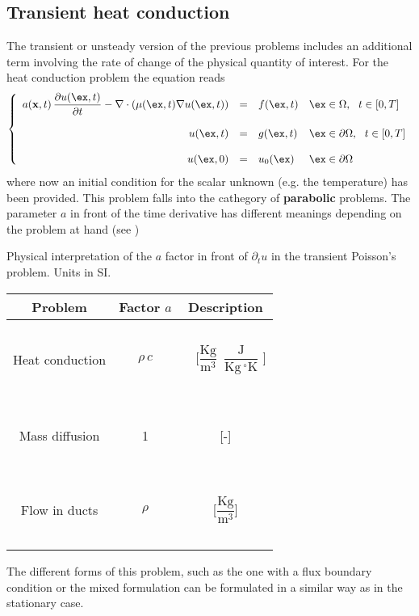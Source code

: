 \subsection{Transient heat conduction} 

The transient or unsteady version of the previous problems includes an additional term
involving the rate of change of the physical quantity of interest.
For the heat conduction problem the equation reads
\begin{equation}
\left \{
\begin{array}{rcll}
a(\mathbf{x},t)\,\dfrac{\partial{u}(\ex,t)}{\partial{t}} -\nabla \cdot \left ( \mu(\ex,t) \nabla{u}(\ex,t) \right) & = & f(\ex,t) & \ex \in \Omega,~~t \in [0,T] \\
& & & \\
u(\ex,t) & = & g(\ex,t) & \ex \in \partial{\Omega},~~t \in [0,T] \\
& & & \\
u(\ex,0) & = & u_0(\ex) & \ex \in \partial{\Omega}
\end{array}
\right.
\end{equation}
where now an initial condition for the scalar unknown (e.g. the temperature)
has been provided. This problem falls into the cathegory of \textbf{parabolic}
problems. The parameter $a$ in front of the time derivative
has different meanings depending on the problem at hand (see )
\begin{margintable}
\caption[]{Physical interpretation of the $a$ factor in front of $\partial_t{u}$ in the transient Poisson's problem. Units in SI.}
\begin{tabular}{ c c c }
	\toprule
	Problem & Factor $a$ & Description \\
	\midrule
	\multirow{3}{4em}{Heat conduction} & ~ & ~ \\
                                         ~ & $\rho \, c$ & ~ {\footnotesize [$\dfrac{\mbox{Kg}}{\mbox{m}^3}$~$\dfrac{\mbox{J}}{\mbox{Kg}\,^{\circ}\mbox{K}}$ ]}  \\ 
                                         ~ & ~ & ~  \\
	\multirow{3}{4em}{Mass diffusion} & ~ & ~ \\
                                        ~ & 1 &  {\footnotesize [-]}\\ 
                                        ~ & ~ & ~\\
        \multirow{3}{4em}{Flow in ducts}  & ~ & ~\\
                                        ~ & $\rho$ & {\footnotesize [$\dfrac{\mbox{Kg}}{\mbox{m}^3}$]}\\ 
                                        ~ & ~ & ~\\
	\bottomrule
\end{tabular}
\end{margintable}
The different forms of this problem, such as the one with a flux boundary condition
or the mixed formulation can be formulated in a similar way as in the stationary case.

